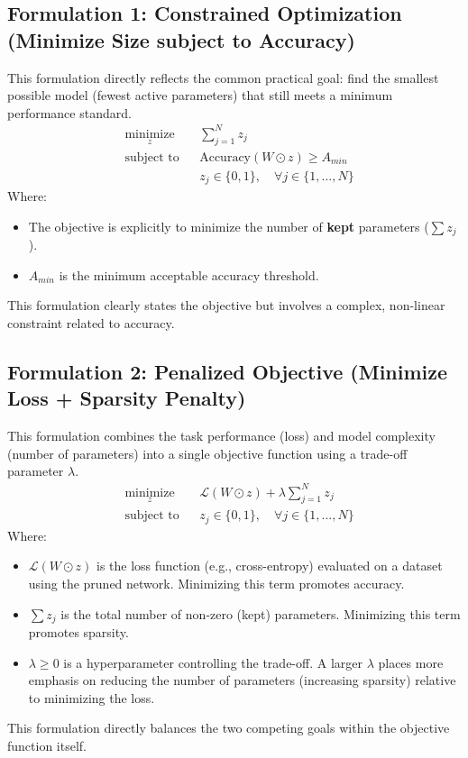 \documentclass[conference]{IEEEtran} %
\begin{document}
\subsection{Formulation 1: Constrained Optimization (Minimize Size subject to Accuracy)}
This formulation directly reflects the common practical goal: find the smallest possible model (fewest active parameters) that still meets a minimum performance standard.
\begin{equation} \label{eq:constrained_opt}
\begin{aligned}
& \underset{z}{\text{minimize}}
& & \sum_{j=1}^{N} z_j \\
& \text{subject to}
& & \text{Accuracy}(W \odot z) \ge A_{min} \\
& & & z_j \in \{0, 1\}, \quad \forall j \in \{1, ..., N\}
\end{aligned}
\end{equation}
Where:
\begin{itemize}
    \item The objective is explicitly to minimize the number of \textbf{kept} parameters ($\sum z_j$).
    \item $A_{min}$ is the minimum acceptable accuracy threshold.
\end{itemize}
This formulation clearly states the objective but involves a complex, non-linear constraint related to accuracy.

\subsection{Formulation 2: Penalized Objective (Minimize Loss + Sparsity Penalty)}
This formulation combines the task performance (loss) and model complexity (number of parameters) into a single objective function using a trade-off parameter $\lambda$.
\begin{equation} \label{eq:penalized_opt}
\begin{aligned}
& \underset{z}{\text{minimize}}
& & \mathcal{L}(W \odot z) + \lambda \sum_{j=1}^{N} z_j \\
& \text{subject to}
& & z_j \in \{0, 1\}, \quad \forall j \in \{1, ..., N\}
\end{aligned}
\end{equation}
Where:
\begin{itemize}
    \item $\mathcal{L}(W \odot z)$ is the loss function (e.g., cross-entropy) evaluated on a dataset using the pruned network. Minimizing this term promotes accuracy.
    \item $\sum z_j$ is the total number of non-zero (kept) parameters. Minimizing this term promotes sparsity.
    \item $\lambda \ge 0$ is a hyperparameter controlling the trade-off. A larger $\lambda$ places more emphasis on reducing the number of parameters (increasing sparsity) relative to minimizing the loss.
\end{itemize}
This formulation directly balances the two competing goals within the objective function itself.
\end{document}
